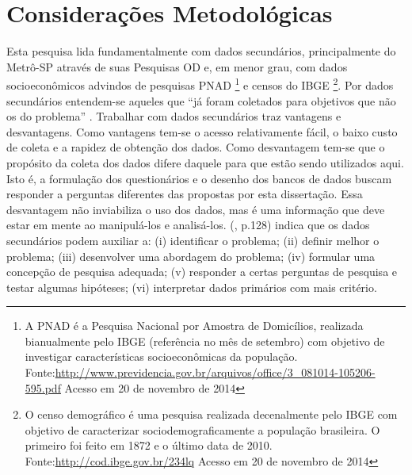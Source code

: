 \chapter{Considerações Metodológicas}\label{chap:metodo}


Esta pesquisa lida fundamentalmente com dados secundários, principalmente do Metrô-SP através de suas Pesquisas OD e, em menor grau, com dados socioeconômicos advindos de pesquisas PNAD%
\footnote{A PNAD é a Pesquisa Nacional por Amostra de Domicílios, realizada bianualmente pelo IBGE (referência no mês de setembro) com objetivo de investigar características socioeconômicas da população. Fonte:\url{http://www.previdencia.gov.br/arquivos/office/3_081014-105206-595.pdf} Acesso em 20 de novembro de 2014} e censos do IBGE%
\footnote{O censo demográfico é uma pesquisa realizada decenalmente pelo IBGE com objetivo de caracterizar sociodemograficamente a população brasileira. O primeiro foi feito em 1872 e o último data de 2010. Fonte:\url{http://cod.ibge.gov.br/234lq} Acesso em 20 de novembro de 2014}.
Por dados secundários entendem-se aqueles que ``já foram coletados para objetivos que não os do problema'' \cite[p.127]{MALHORTA2001}. Trabalhar com dados secundários traz vantagens e desvantagens. Como vantagens tem-se o acesso relativamente fácil, o baixo custo de coleta e a rapidez de obtenção dos dados. 
Como desvantagem tem-se que o propósito da coleta dos dados difere daquele para que estão sendo utilizados aqui. Isto é, a formulação dos questionários e o desenho dos bancos de dados buscam responder a perguntas diferentes das propostas por esta dissertação.
Essa desvantagem não inviabiliza o uso dos dados, mas é uma informação que deve estar em mente ao manipulá-los e analisá-los.  (\citeyear{MALHORTA2001}, p.128) indica que os dados secundários podem auxiliar a:
(i) identificar o problema; 
(ii) definir melhor o problema; 
(iii) desenvolver uma abordagem do problema; 
(iv) formular uma concepção de pesquisa adequada; 
(v) responder a certas perguntas de pesquisa e testar algumas hipóteses; 
(vi) interpretar dados primários com mais critério.

